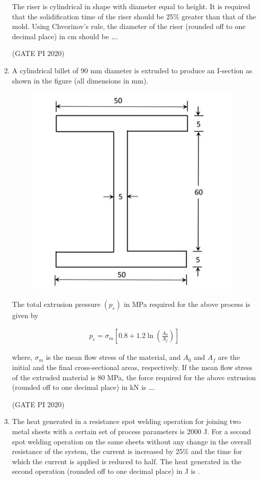 \documentclass[journal,12pt,onecolumn]{IEEEtran}
\theoremstyle{remark}
\begin{document}
\begin{enumerate}
The riser is cylindrical in shape with diameter equal to height. It is required that the solidification time of the riser should be 25\% greater than that of the mold. Using Chvorinov's rule, the diameter of the riser (rounded off to one decimal place) in cm should be \dots.

\hfill (GATE PI 2020)

\item A cylindrical billet of 90 mm diameter is extruded to produce an I-section as shown in the figure (all dimensions in mm).
\begin{figure}[h]
    \centering
    \includegraphics[width=0.5\columnwidth]{figs/fig17.png}
    \caption{}
    \label{fig:placeholder}
\end{figure}

The total extrusion pressure $(p_e)$ in MPa required for the above process is given by

\begin{align*}
p_e = \sigma_m \left[ 0.8 + 1.2 \ln \left( \frac{A_0}{A_f} \right) \right]
\end{align*}

where, $\sigma_m$ is the mean flow stress of the material, and $A_0$ and $A_f$ are the initial and the final cross-sectional areas, respectively. If the mean flow stress of the extruded material is 80 MPa, the force required for the above extrusion (rounded off to one decimal place) in kN is \dots.

\hfill (GATE PI 2020)

\item The heat generated in a resistance spot welding operation for joining two metal sheets with a certain set of process parameters is 2000 J. For a second spot welding operation on the same sheets without any change in the overall resistance of the system, the current is increased by 25\% and the time for which the current is applied is reduced to half. The heat generated in the second operation (rounded off to one decimal place) in J is .


\end{enumerate}
\end{document}
